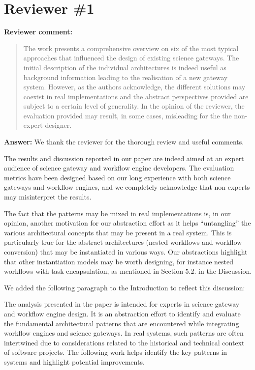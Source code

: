 \documentclass[a4]{article}
\newenvironment{review}%
{\textbf{Reviewer comment:}\begin{quote}}%
{\end{quote}}%
\newcommand{\answer}[1]{\textbf{Answer:} #1}
\newcommand{\revised}[1]{\color{blue} #1\color{black}}
\begin{document}
\section{Reviewer \#1}

\begin{review}
  The work presents a comprehensive overview on six of the most
  typical approaches that influenced the design of existing science
  gateways. The initial description of the individual architectures is
  indeed useful as background information leading to the realisation
  of a new gateway system. However, as the authors acknowledge, the
  different solutions may coexist in real implementations and the
  abstract perspectives provided are subject to a certain level of
  generality. In the opinion of the reviewer, the evaluation provided
  may result, in some cases, misleading for the the non-expert
  designer.
\end{review}

\answer{We thank the reviewer for the thorough review and useful comments.

  The results and discussion reported in our paper are indeed aimed at
  an expert audience of science gateway and workflow engine
  developers. The evaluation metrics have been designed based on our
  long experience with both science gateways and workflow engines, and
  we completely acknowledge that non experts may misinterpret the
  results.

  The fact that the patterns may be mixed in real implementations is,
  in our opinion, another motivation for our abstraction effort as it
  helps ``untangling'' the various architectural concepts that may be
  present in a real system. This is particularly true for the abstract
  architectures (nested workflows and workflow conversion) that may be
  instantiated in various ways. Our abstractions highlight that other
  instantiation models may be worth designing, for instance nested
  workflows with task encapsulation, as mentioned in Section 5.2. in
  the Discussion.

  We added the following paragraph to the Introduction to reflect this discussion:}

\revised{The analysis presented in the paper is intended for
experts in science gateway and workflow engine design. It is an
abstraction effort to identify and evaluate the fundamental
architectural patterns that are encountered while integrating workflow
engines and science gateways. In real systems, such patterns are often
intertwined due to considerations related to the historical and
technical context of software projects. The following work helps
identify the key patterns in systems and highlight potential
improvements.}
\end{document}
